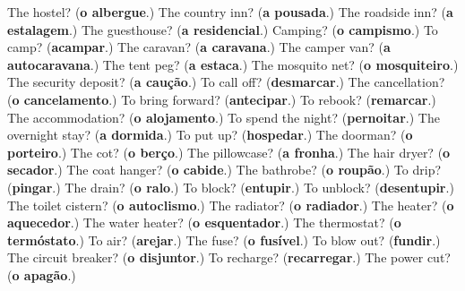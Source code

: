 \begin{tcolorbox}[breakable,colback=teal!4,colframe=teal!35!black,title={Before you move on}]
The hostel? (\textbf{o albergue}.) The country inn? (\textbf{a pousada}.) The roadside inn? (\textbf{a estalagem}.) The guesthouse? (\textbf{a residencial}.) Camping? (\textbf{o campismo}.) To camp? (\textbf{acampar}.) The caravan? (\textbf{a caravana}.) The camper van? (\textbf{a autocaravana}.) The tent peg? (\textbf{a estaca}.) The mosquito net? (\textbf{o mosquiteiro}.) The security deposit? (\textbf{a caução}.) To call off? (\textbf{desmarcar}.) The cancellation? (\textbf{o cancelamento}.) To bring forward? (\textbf{antecipar}.) To rebook? (\textbf{remarcar}.) The accommodation? (\textbf{o alojamento}.) To spend the night? (\textbf{pernoitar}.) The overnight stay? (\textbf{a dormida}.) To put up? (\textbf{hospedar}.) The doorman? (\textbf{o porteiro}.) The cot? (\textbf{o berço}.) The pillowcase? (\textbf{a fronha}.) The hair dryer? (\textbf{o secador}.) The coat hanger? (\textbf{o cabide}.) The bathrobe? (\textbf{o roupão}.) To drip? (\textbf{pingar}.) The drain? (\textbf{o ralo}.) To block? (\textbf{entupir}.) To unblock? (\textbf{desentupir}.) The toilet cistern? (\textbf{o autoclismo}.) The radiator? (\textbf{o radiador}.) The heater? (\textbf{o aquecedor}.) The water heater? (\textbf{o esquentador}.) The thermostat? (\textbf{o termóstato}.) To air? (\textbf{arejar}.) The fuse? (\textbf{o fusível}.) To blow out? (\textbf{fundir}.) The circuit breaker? (\textbf{o disjuntor}.) To recharge? (\textbf{recarregar}.) The power cut? (\textbf{o apagão}.)
\end{tcolorbox}
